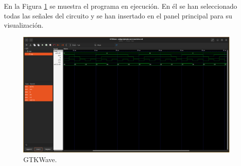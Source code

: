 En la Figura \ref{fig:gtkwave-ejemplo-con-traza} se muestra el programa en ejecución. En él se han seleccionado todas las señales del circuito y se han insertado en el panel principal para su visualización.

\begin{figure}[htb]
	\centering
	\includegraphics[width=\textwidth]{figs/gtkwave-ejemplo-con-traza.png}
	\caption{GTKWave.}
	\label{fig:gtkwave-ejemplo-con-traza}
\end{figure}
